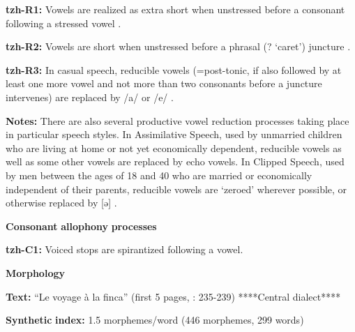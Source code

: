 \documentclass[output=paper]{langsci/langscibook}
\begin{document}
\begin{styleBody}
\textbf{tzh-R1:} Vowels are realized as extra short when unstressed before a consonant following a stressed vowel \citep[12]{Kaufman1971}.
\end{styleBody}

\begin{styleBody}
\textbf{tzh-R2:} Vowels are short when unstressed before a phrasal (? ‘caret’) juncture \citep[12]{Kaufman1971}.
\end{styleBody}

\begin{styleBody}
\textbf{tzh-R3:} In casual speech, reducible vowels (=post-tonic, if also followed by at least one more vowel and not more than two consonants before a juncture intervenes) are replaced by /a/ or /e/ \citep[26-7]{Kaufman1971}.
\end{styleBody}

\begin{styleBody}
\textbf{Notes:} There are also several productive vowel reduction processes taking place in particular speech styles. In Assimilative Speech, used by unmarried children who are living at home or not yet economically dependent, reducible vowels as well as some other vowels are replaced by echo vowels. In Clipped Speech, used by men between the ages of 18 and 40 who are married or economically independent of their parents, reducible vowels are ‘zeroed’ wherever possible, or otherwise replaced by [ə] \citep[26-7]{Kaufman1971}.
\end{styleBody}

\begin{styleBody}
\textbf{Consonant} \textbf{allophony} \textbf{processes}
\end{styleBody}

\begin{styleBody}
\textbf{tzh-C1:} Voiced stops are spirantized following a vowel. \citep[11]{Kaufman1971}
\end{styleBody}

\begin{styleBody}
\textbf{Morphology}
\end{styleBody}

\begin{styleBody}
\textbf{Text:} “Le voyage à la finca” (first 5 pages, \citealt{Polian2006}: 235-239) ****Central dialect****
\end{styleBody}

\begin{styleBody}
\textbf{Synthetic} \textbf{index:} 1.5 morphemes/word (446 morphemes, 299 words)
\end{styleBody}
\end{document}

